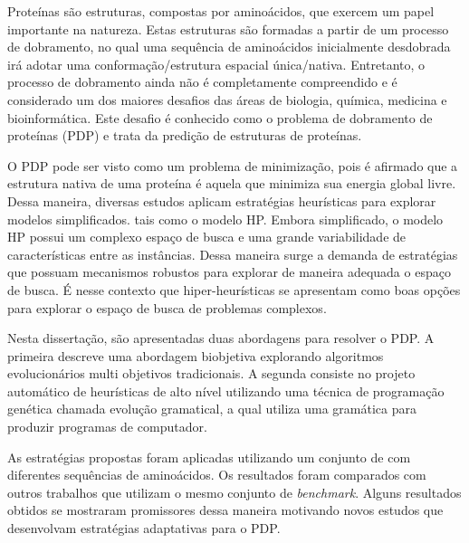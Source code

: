 \begin{resumo}


Proteínas são estruturas, compostas por aminoácidos, que exercem um papel importante na natureza. Estas estruturas são formadas a partir de um processo de dobramento, no qual uma sequência de aminoácidos inicialmente desdobrada irá adotar uma conformação/estrutura espacial única/nativa. Entretanto, o processo de dobramento ainda não é completamente compreendido e é considerado um dos maiores desafios das áreas de biologia, química, medicina e bioinformática. Este desafio é conhecido como o problema de dobramento de proteínas (PDP) e trata da predição de estruturas de proteínas. 

O PDP pode ser visto como um problema de minimização, pois é afirmado que a estrutura nativa de uma proteína é aquela que minimiza sua energia global livre. Dessa maneira, diversas estudos aplicam estratégias heurísticas para explorar modelos simplificados. tais como o modelo HP. Embora simplificado, o modelo HP possui um complexo espaço de busca e uma grande variabilidade de características entre as instâncias. Dessa maneira surge a demanda de estratégias que possuam mecanismos robustos para explorar de maneira adequada o espaço de busca. É nesse contexto que hiper-heurísticas se apresentam como boas opções para explorar o espaço de busca de problemas complexos. 



Nesta dissertação, são apresentadas duas abordagens para resolver o PDP. A primeira descreve uma abordagem biobjetiva explorando  algoritmos evolucionários multi objetivos tradicionais. A segunda consiste no projeto automático de heurísticas de alto nível utilizando uma técnica de programação genética chamada evolução gramatical, a qual utiliza uma gramática para produzir programas de computador. 

 As estratégias propostas foram aplicadas utilizando um conjunto de  com diferentes sequências de aminoácidos. Os resultados foram comparados com outros trabalhos que utilizam o mesmo conjunto de \textit{benchmark}. Alguns resultados obtidos se mostraram promissores dessa maneira motivando novos estudos que desenvolvam estratégias adaptativas para o PDP.



\end{resumo}

